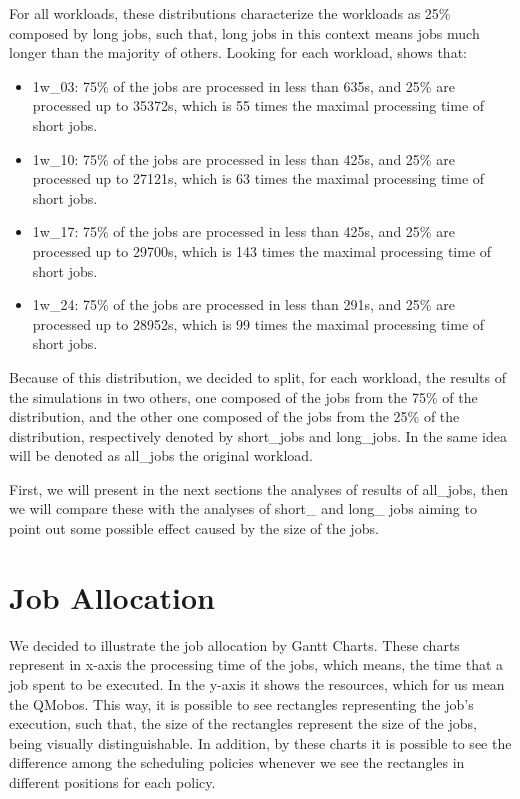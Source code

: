 For all workloads, these distributions characterize the workloads as 25\% composed by long jobs, such that, long jobs in this context means jobs much longer than the majority of others. Looking for each workload,  shows that:
\begin{itemize}
    \item 1w\_03: 75\% of the jobs are processed in less than 635s, and 25\% are processed up to 35372s, which is 55 times the maximal processing time of short jobs.
    
    \item 1w\_10: 75\% of the jobs are processed in less than 425s, and 25\% are processed up to 27121s, which is 63 times the maximal processing time of short jobs.
    
    \item 1w\_17: 75\% of the jobs are processed in less than 425s, and 25\% are processed up to 29700s, which is 143 times the maximal processing time of short jobs.
    
    \item 1w\_24: 75\% of the jobs are processed in less than 291s, and 25\% are processed up to 28952s, which is 99 times the maximal processing time of short jobs.
\end{itemize}

Because of this distribution, we decided to split, for each workload, the results of the simulations in two others, one composed of the jobs from the 75\% of the distribution, and the other one composed of the jobs from the 25\% of the distribution, respectively denoted by short\_jobs and long\_jobs. In the same idea will be denoted as all\_jobs the original workload.%

First, we will present in the next sections the analyses of results of all\_jobs, then we will compare these with the analyses of short\_ and long\_ jobs aiming to point out some possible effect caused by the size of the jobs.

\section{Job Allocation}

We decided to illustrate the job allocation by Gantt Charts. These charts represent in x-axis the processing time of the jobs, which means, the time that a job spent to be executed. In the y-axis it shows the resources, which for us mean the QMobos.
This way, it is possible to see rectangles representing the job's execution, such that, the size of the rectangles represent the size of the jobs, being visually distinguishable.
In addition, by these charts it is possible to see the difference among the scheduling policies whenever we see the rectangles in different positions for each policy.


